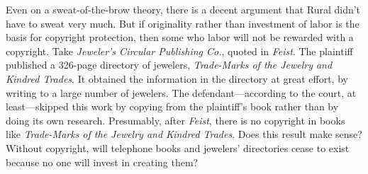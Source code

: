 
\item Even on a sweat-of-the-brow theory, there is a decent argument that Rural
didn't have to sweat very much. But if originality rather than investment of
labor is the basis for copyright protection, then some who labor will not be
rewarded with a copyright. Take \textit{Jeweler's Circular Publishing Co.},
quoted in \textit{Feist}. The plaintiff published a 326-page directory of
jewelers, \textit{Trade-Marks of the Jewelry and Kindred Trades}. It obtained
the information in the directory at great effort, by writing to a large number
of jewelers. The defendant---according to the court, at least---skipped this
work by copying from the plaintiff's book rather than by doing its own
research. Presumably, after \textit{Feist}, there is no copyright in books like
\textit{Trade-Marks of the Jewelry and Kindred Trades}. Does this result make
sense? Without copyright, will telephone books and jewelers' directories cease
to exist because no one will invest in creating them?

